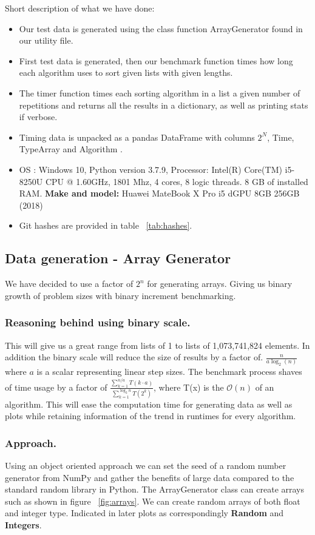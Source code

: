 \documentclass[sigconf, nonacm, natbib, screen, balance=False]{acmart}
\begin{document}
Short description of what we have done:
\begin{itemize}
\item Our test data is generated using the class function ArrayGenerator found in our utility file.
\item First test data is generated, then our benchmark function times how long each algorithm uses to sort given lists with given lengths.  
\item The timer function times each sorting algorithm in a list a given number of repetitions and returns all the results in a dictionary, as well as printing stats if verbose.
\item Timing data is unpacked as a pandas DataFrame with columns $2^N$, Time, TypeArray and Algorithm . 
\item OS : Windows 10, Python version 3.7.9, 
Processor:	Intel(R) Core(TM) i5-8250U CPU @ 1.60GHz, 1801 Mhz, 4 cores, 8 logic threads.
8 GB of installed RAM. 
\textbf{Make and model:} Huawei MateBook X Pro i5 dGPU 8GB 256GB (2018)

\item Git hashes are provided in table ~\ref{tab:hashes}.
\end{itemize}

\subsection{Data generation - Array Generator}\label{sec:methdata}
We have decided to use a factor of $2^n$ for generating arrays. Giving us binary growth of problem sizes with binary increment benchmarking. 

\subsubsection{Reasoning behind using binary scale.}\label{sec:datareason} This will give us a great range from lists of 1 to lists of 1,073,741,824 elements. In addition the binary scale will reduce the size of results by a factor of. $\frac{n}{a \log_2(n)}$ where $a$ is a scalar representing linear step sizes. The benchmark process shaves of time usage by a factor of $\frac{\sum_{k=1}^{n/a}T\left(k\cdot a \right)}{\sum_{k=1}^{\log_{2}n}T \left(2^{k}\right)}$, where T(x) is the $\mathcal{O}(n)$ of an algorithm. This will ease the computation time for generating data as well as plots while retaining information of the trend in runtimes for every algorithm. 

\subsubsection{Approach.}\label{sec:dataapproach}Using an object oriented approach we can set the seed of a random number generator from NumPy and gather the benefits of large data compared to the standard random library in Python. 
The ArrayGenerator class can create arrays such as shown in figure ~\ref{fig:arrays}. We can create random arrays of both float and integer type. Indicated in later plots as correspondingly \textbf{Random} and \textbf{Integers}. 
\end{document}

